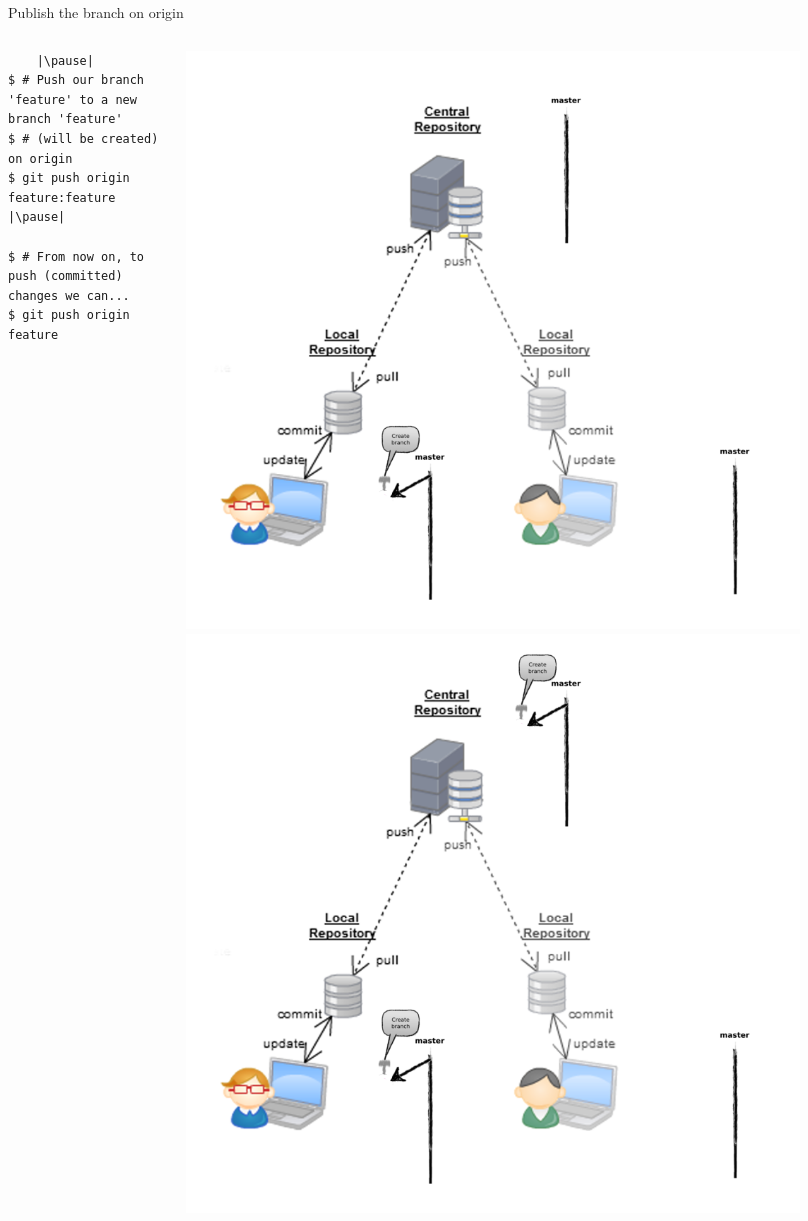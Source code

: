 \begin{frame}[fragile]{Publish the branch on origin}
\begin{columns}
	\begin{column}{0.6\textwidth}
	\begin{lstlisting}
	|\pause|
$ # Push our branch 'feature' to a new branch 'feature' 
$ # (will be created) on origin
$ git push origin feature:feature |\pause|

$ # From now on, to push (committed) changes we can...
$ git push origin feature
	\end{lstlisting}
	\end{column}
	\begin{column}{0.4\textwidth}
		\begin{center}
			 {
				\includegraphics[width=0.9\textwidth]{multiuser_local_branch.png}
			}\only<2> {
				\includegraphics[width=0.9\textwidth]{multiuser_remote_branch.png}
}
\end{center}
\end{column}
\end{columns}
\end{frame}

